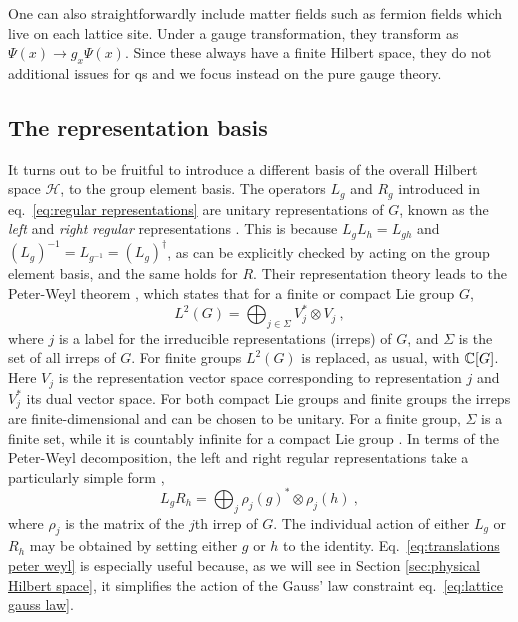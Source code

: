 One can also straightforwardly include matter fields such as fermion fields which live on each lattice site.
Under a gauge transformation, they transform as $\Psi(x) \to g_x \Psi(x)$.
Since these always have a finite Hilbert space, they do not additional issues for \ac{qs} and we focus instead on the pure gauge theory.


%
%
\subsection{The representation basis}
\label{sub:the_representation_basis}


It turns out to be fruitful to introduce a different basis of the overall Hilbert space $\mathcal{H}$,  to the group element basis.
The operators $L_g$ and $R_g$ introduced in eq.~\eqref{eq:regular representations} are unitary representations of $G$, known as the \textit{left} and \textit{right regular} representations \cite{Serre, KnappLieGroups}.
This is because $L_g L_h = L_{gh}$ and $(L_g)^{-1}=L_{g^{-1}}=(L_g)^\dagger$, as can be explicitly checked by acting on the group element basis, and the same holds for $R$.
Their representation theory leads to the Peter-Weyl theorem \cite{KnappLieGroups, milstead2018qyangmills, marianithesis}, which states that for a finite or compact Lie group $G$,
\begin{equation}
    \label{eq:peterweyl}
    L^2(G) = \bigoplus_{j \in \Sigma} V_j^* \otimes V_j \ ,
\end{equation}
where $j$ is a label for the irreducible representations (irreps) of $G$, and $\Sigma$ is the set of all irreps of $G$.
For finite groups $L^2(G)$ is replaced, as usual, with $\mathbb{C}[G]$.
Here $V_j$ is the representation vector space corresponding to representation $j$ and $V_j^*$ its dual vector space.
For both compact Lie groups and finite groups the irreps are finite-dimensional and can be chosen to be unitary.
For a finite group, $\Sigma$ is a finite set, while it is countably infinite for a compact Lie group \cite{KnappLieGroups, Serre}.
In terms of the Peter-Weyl decomposition, the left and right regular representations take a particularly simple form \cite{marianithesis},
\begin{equation}
    \label{eq:translations peter weyl}
    L_g R_h = \bigoplus_j \rho_j(g)^* \otimes \rho_j(h) \ ,
\end{equation}
where $\rho_j$ is the matrix of the $j$th irrep of $G$.
The individual action of either $L_g$ or $R_h$ may be obtained by setting either $g$ or $h$ to the identity.
Eq.~\eqref{eq:translations peter weyl} is especially useful because, as we will see in Section \ref{sec:physical Hilbert space}, it simplifies the action of the Gauss' law constraint eq.~\eqref{eq:lattice gauss law}.

